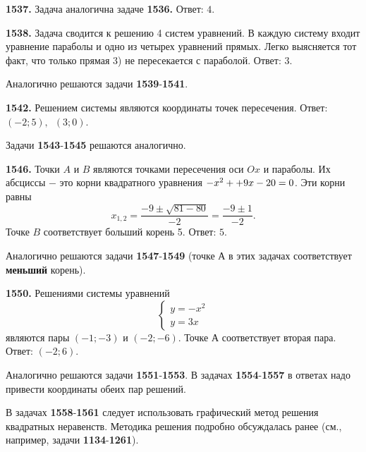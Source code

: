 \textbf{1537.}  Задача аналогична задаче \textbf{1536.} \newline \null \hspace*{\fill} Ответ: $4$.

\textbf{1538.} Задача сводится к  решению 4 систем уравнений. В каждую систему входит уравнение параболы и одно из четырех уравнений прямых. Легко выясняется тот факт, что только прямая 3) не пересекается с параболой. \newline \null \hspace*{\fill} Ответ: $3$.

Аналогично решаются задачи  \textbf{1539}-\textbf{1541}.

\textbf{1542.}  Решением системы являются координаты точек пересечения. \newline \null \hspace*{\fill} Ответ: $(-2;5),\enspace (3;0)$.

Задачи  \textbf{1543}-\textbf{1545} решаются аналогично.

\newpage \textbf{1546.} Точки $A$ и $B$ являются точками пересечения оси $Ox$ и параболы. Их абсциссы $-$ это корни квадратного уравнения $-x^2+\linebreak+9x-20=0$. Эти корни равны  $$x_{1,2}=\frac{-9\pm\sqrt{81-80}}{-2}=\frac{-9\pm1}{-2}.$$ Точке $B$ соответствует больший корень 5. \newline \null \hspace*{\fill} Ответ: $5$.

Аналогично решаются задачи \textbf{1547}-\textbf{1549} (точке $А$ в этих задачах соответствует \textbf{меньший} корень).

\textbf{1550.} Решениями системы уравнений $$\begin{cases}
	y=-x^2
	\\
	y=3x	
  \end{cases}$$ являются пары  $(-1;-3)$ и $(-2;-6)$. Точке $А$ соответствует вторая пара. \newline \null \hspace*{\fill} Ответ: $(-2;6)$.

Аналогично решаются задачи \textbf{1551}-\textbf{1553}. В задачах \textbf{1554}-\textbf{1557} в ответах надо привести координаты обеих пар решений.

В задачах \textbf{1558}-\textbf{1561} следует использовать графический метод  решения квадратных неравенств.  Методика решения  подробно обсуждалась ранее  (см., например,  задачи \textbf{1134}-\textbf{1261}). 

